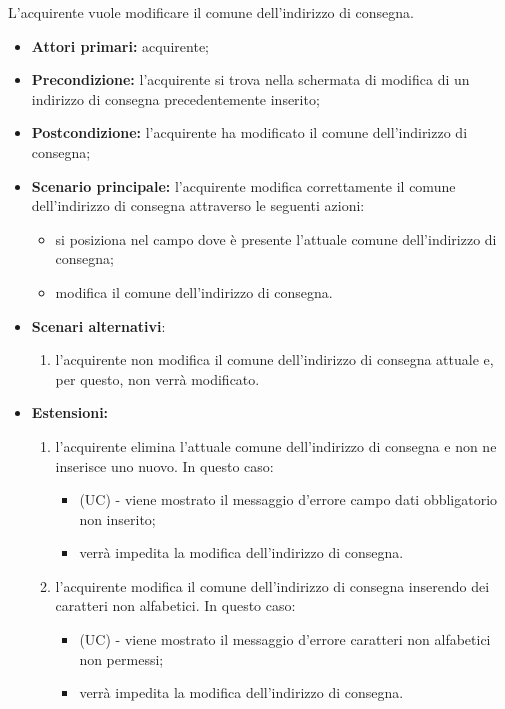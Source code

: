 L'acquirente vuole modificare il comune dell'indirizzo di consegna.
\begin{itemize}
    \item \textbf{Attori primari:} acquirente;
    \item \textbf{Precondizione:} l'acquirente si trova nella schermata di modifica di un indirizzo di consegna precedentemente inserito;
    \item \textbf{Postcondizione:} l'acquirente ha modificato il comune dell'indirizzo di consegna;
    \item \textbf{Scenario principale:} l'acquirente modifica correttamente il comune dell'indirizzo di consegna attraverso le seguenti azioni:
    \begin{itemize}
        \item si posiziona nel campo dove è presente l'attuale comune dell'indirizzo di consegna;
        \item modifica il comune dell'indirizzo di consegna.
    \end{itemize}
    \item \textbf{Scenari alternativi}:
    \begin{enumerate}[label=\lett]
        \item l'acquirente non modifica il comune dell'indirizzo di consegna attuale e, per questo, non verrà modificato.
    \end{enumerate}
    \item \textbf{Estensioni:}
    \begin{enumerate}[label=\lett]
        \item l'acquirente elimina l'attuale comune dell'indirizzo di consegna e non ne inserisce uno nuovo. In questo caso:
        \begin{itemize}
            \item (UC) - viene mostrato il messaggio d'errore campo dati obbligatorio non inserito;
            \item verrà impedita la modifica dell'indirizzo di consegna.
        \end{itemize}
        \item l'acquirente modifica il comune dell'indirizzo di consegna inserendo dei caratteri non alfabetici. In questo caso:
        \begin{itemize}
            \item (UC) - viene mostrato il messaggio d'errore caratteri non alfabetici non permessi;
            \item verrà impedita la modifica dell'indirizzo di consegna.
        \end{itemize}
    \end{enumerate}
\end{itemize}

